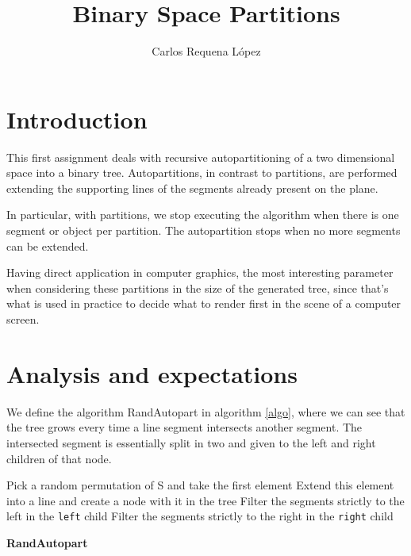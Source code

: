 \documentclass[12pt,a4paper]{article}
\title{Binary Space Partitions}
\author{Carlos Requena López}
\begin{document}
\maketitle
\thispagestyle{empty}
\tableofcontents
\newpage
\pagestyle{fancy}
\setcounter{page}{1}


\section{Introduction}

This first assignment deals with recursive autopartitioning of a two
dimensional space into a binary tree. Autopartitions, in contrast to
partitions, are performed extending the supporting lines of the
segments already present on the plane.

In particular, with partitions, we stop executing the algorithm when
there is one segment or object per partition. The autopartition stops
when no more segments can be extended.

Having direct application in computer graphics, the most interesting
parameter when considering these partitions in the size of the
generated tree, since that's what is used in practice to decide what
to render first in the scene of a computer screen.

\section{Analysis and expectations}

We define the algorithm RandAutopart in algorithm \ref{algo}, where we
can see that the tree grows every time a line segment intersects
another segment. The intersected segment is essentially split in two
and given to the left and right children of that node.

\begin{algorithm}[h]
  \SetAlgoLined

  \nl Pick a random permutation of S and take the first element\;
  \nl Extend this element into a line and create a node with it in the tree\;
  \nl Filter the segments strictly to the left in the \texttt{left}
  child\;
  \nl Filter the segments strictly to the right in the \texttt{right}
  child\;
  \nl {}
  \nl {}
\caption{\bf RandAutopart}
\label{algo}
\end{algorithm}
\end{document}
